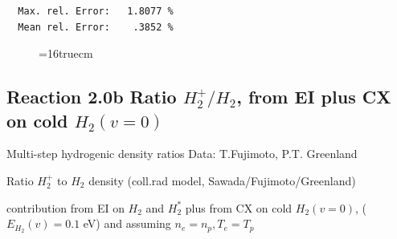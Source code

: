 \documentclass[12pt,dvips]{article}
\begin{document}
\begin{small}
\begin{verbatim}
  Max. rel. Error:   1.8077 %
  Mean rel. Error:    .3852 %

\end{verbatim}\end{small}
\begin{figure} \label{h12_2.0a}
\epsfxsize=16truecm
\end{figure}

\newpage
\subsection{
Reaction 2.0b Ratio $H_2^+/H_2$, from EI plus CX on cold $H_2(v=0)$
}

 Multi-step hydrogenic density ratios
 Data: T.Fujimoto, P.T. Greenland


  Ratio $H_2^+$ to $H_2$ density
  (coll.rad model, Sawada/Fujimoto/Greenland)

  contribution from  EI on $H_2$ and $H_2^*$  plus from CX on cold $H_2(v=0)$,
($E_{H_2}(v)=0.1$ eV) and assuming $n_e=n_p, T_e=T_p$
\end{document}
